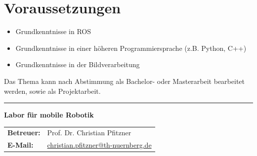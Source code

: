 \documentclass[a4paper,11pt]{article}
\begin{document}
\section*{Voraussetzungen}
\begin{itemize}[leftmargin=0.5cm]
    \item Grundkenntnisse in ROS 
    \item Grundkenntnisse in einer höheren Programmiersprache (z.B. Python, C++)
    \item Grundkenntnisse in der Bildverarbeitung
\end{itemize}

\vspace{0.5cm}
Das Thema kann nach Abstimmung als Bachelor- oder Masterarbeit bearbeitet werden, sowie als Projektarbeit. 


\vfill
\textcolor{ohm_red}{\rule{\linewidth}{0.4mm}}
\textbf{\textcolor{ohm_red}{Labor für mobile Robotik}} \\
\begin{tabular}{@{}ll}
\textbf{Betreuer:} & Prof. Dr. Christian Pfitzner \\
\textbf{E-Mail:}   & \href{mailto:christian.pfitzner@th-nuernberg.de}{christian.pfitzner@th-nuernberg.de} \\
\end{tabular}
\end{document}
